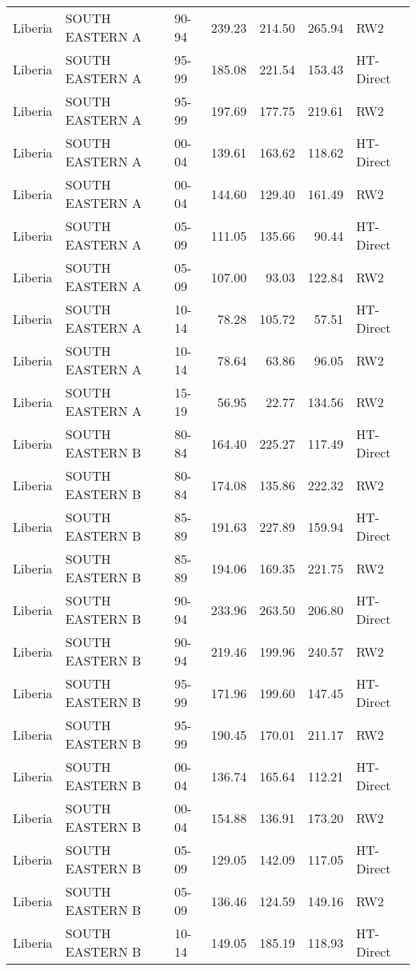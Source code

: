 \begin{longtable}{lllrrrl}
  Liberia & SOUTH EASTERN A & 90-94 & 239.23 & 214.50 & 265.94 & RW2 \\ 
  Liberia & SOUTH EASTERN A & 95-99 & 185.08 & 221.54 & 153.43 & HT-Direct \\ 
  Liberia & SOUTH EASTERN A & 95-99 & 197.69 & 177.75 & 219.61 & RW2 \\ 
  Liberia & SOUTH EASTERN A & 00-04 & 139.61 & 163.62 & 118.62 & HT-Direct \\ 
  Liberia & SOUTH EASTERN A & 00-04 & 144.60 & 129.40 & 161.49 & RW2 \\ 
  Liberia & SOUTH EASTERN A & 05-09 & 111.05 & 135.66 & 90.44 & HT-Direct \\ 
  Liberia & SOUTH EASTERN A & 05-09 & 107.00 & 93.03 & 122.84 & RW2 \\ 
  Liberia & SOUTH EASTERN A & 10-14 & 78.28 & 105.72 & 57.51 & HT-Direct \\ 
  Liberia & SOUTH EASTERN A & 10-14 & 78.64 & 63.86 & 96.05 & RW2 \\ 
  Liberia & SOUTH EASTERN A & 15-19 & 56.95 & 22.77 & 134.56 & RW2 \\ 
  Liberia & SOUTH EASTERN B & 80-84 & 164.40 & 225.27 & 117.49 & HT-Direct \\ 
  Liberia & SOUTH EASTERN B & 80-84 & 174.08 & 135.86 & 222.32 & RW2 \\ 
  Liberia & SOUTH EASTERN B & 85-89 & 191.63 & 227.89 & 159.94 & HT-Direct \\ 
  Liberia & SOUTH EASTERN B & 85-89 & 194.06 & 169.35 & 221.75 & RW2 \\ 
  Liberia & SOUTH EASTERN B & 90-94 & 233.96 & 263.50 & 206.80 & HT-Direct \\ 
  Liberia & SOUTH EASTERN B & 90-94 & 219.46 & 199.96 & 240.57 & RW2 \\ 
  Liberia & SOUTH EASTERN B & 95-99 & 171.96 & 199.60 & 147.45 & HT-Direct \\ 
  Liberia & SOUTH EASTERN B & 95-99 & 190.45 & 170.01 & 211.17 & RW2 \\ 
  Liberia & SOUTH EASTERN B & 00-04 & 136.74 & 165.64 & 112.21 & HT-Direct \\ 
  Liberia & SOUTH EASTERN B & 00-04 & 154.88 & 136.91 & 173.20 & RW2 \\ 
  Liberia & SOUTH EASTERN B & 05-09 & 129.05 & 142.09 & 117.05 & HT-Direct \\ 
  Liberia & SOUTH EASTERN B & 05-09 & 136.46 & 124.59 & 149.16 & RW2 \\ 
  Liberia & SOUTH EASTERN B & 10-14 & 149.05 & 185.19 & 118.93 & HT-Direct \\ 

\end{longtable}
